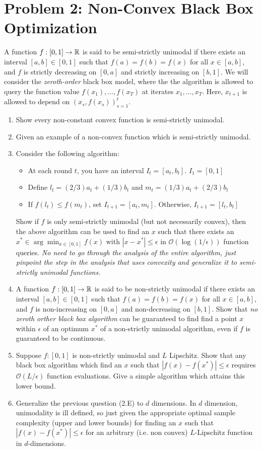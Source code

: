 \documentclass[12pt]{article}
\begin{document}
\section*{Problem 2: Non-Convex Black Box Optimization}
A function $f:[0,1] \to \mathbb{R}$ is said to be semi-strictly unimodal if there exists an interval $[a,b] \in [0,1]$ such that $f(a) = f(b) = f(x)$ for all $x \in [a,b]$, and $f$ is strictly decreasing on $[0,a]$ and strictly increasing on $[b,1]$. We will consider the \emph{zeroth-order} black box model, where the the algorithm is allowed to query the function value $f(x_1),\dots,f(x_T)$ at iterates $x_1,\dots,x_T$. Here, $x_{t+1}$ is allowed to depend on $(x_s,f(x_s))_{s=1}^t$. 
\begin{enumerate}
	\item Show every non-constant convex function is semi-strictly unimodal.
	\item Given an example of a non-convex function which is semi-strictly unimodal.
	\item Consider the following algorithm:
	\begin{itemize}
		\item At each round $t$, you have an interval $I_t = [a_t,b_t]$. $I_1 = [0,1]$
		\item Define $l_t = (2/3)a_t + (1/3)b_t$ and $m_t = (1/3)a_t + (2/3)b_t$
		\item  If $f(l_t) \le f(m_t)$, set $I_{t+1} = [a_t,m_t]$. Otherwise, $I_{t+1} = [l_t,b_t]$
		\end{itemize}

	Show if $f$ is only semi-strictly unimodal (but not necessarily convex), then the above algorithm can be used to find an $x$ such that there exists an $x^* \in \arg\min_{x \in [0,1]} f(x)$ with $|x-x^*| \le \epsilon$ in $\mathcal{O}(\log(1/\epsilon))$ function queries. 
	\emph{No need to go through the analysis of the entire algorithm, just pinpoint the step in the analysis that uses convexity and generalize it to semi-strictly unimodal functions.}
	\item A function $f:[0,1] \to \mathbb{R}$ is said to be non-strictly unimodal if there exists an interval $[a,b] \in [0,1]$ such that $f(a) = f(b) = f(x)$ for all $x \in [a,b]$, and $f$ is non-increasing on $[0,a]$ and non-decreasing on $[b,1]$. 
	Show that \emph{no zeroth orther black box algorithm} can be guaranteed to find find a point $x$ within $\epsilon$ of an optimum $x^*$ of a non-strictly unimodal algorithm, even if $f$ is guaranteed to be continuous. 
	\item Suppose $f: [0,1]$ is non-strictly unimodal and $L$ Lipschitz. Show that any black box algorithm which find an $x$ such that $|f(x)-f(x^*)| \le \epsilon$ requires $\mathcal{O}(L/\epsilon)$ function evaluations. Give a simple algorithm which attains this lower bound.
	\item Generalize the previous question (2.E) to $d$ dimensions. In $d$ dimension, unimodality is ill defined, so just given the appropriate optimal sample complexity (upper and lower bounds) for finding an $x$ such that $|f(x)-f(x^*)| \le \epsilon$ for an arbitrary (i.e. non convex) $L$-Lipschitz function in $d$-dimensions. 
\end{enumerate}
\end{document}

